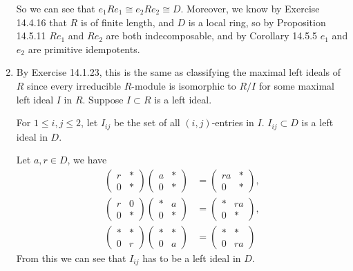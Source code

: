 \documentclass[a4paper, 12pt]{article}
\begin{document}
\begin{solution}
\begin{enumerate}[(1)]
So we can see that \(e_1Re_1\cong e_2Re_2\cong D\). Moreover, we know by Exercise 14.4.16 that \(R\) is of finite length, and \(D\) is a local ring, so by Proposition 14.5.11 \(Re_1\) 
and \(Re_2\) are both indecomposable, and by Corollary 14.5.5 \(e_1\) and \(e_2\) are primitive idempotents.
\item By Exercise 14.1.23, this is the same as classifying the maximal left ideals of \(R\) since every irreducible \(R\)-module is isomorphic to \(R/I\) for some maximal left ideal \(I\) in \(R\). Suppose \(I\subset R\) is a left ideal. 
\begin{claim}
For \(1\leq i,j\leq 2\), let \(I_{ij}\) be the set of all \((i,j)\)-entries in \(I\). \(I_{ij}\subset D\) is a left ideal in \(D\).
\end{claim}
\begin{claimproof}
Let \(a,r\in D\), we have 
\begin{align*}
\begin{pmatrix}
    r&*\\ 
    0&*
\end{pmatrix}\begin{pmatrix}
    a&*\\ 
    0&*
\end{pmatrix}&=\begin{pmatrix}
    ra&*\\ 
    0&*
\end{pmatrix},\\[5pt]
\begin{pmatrix}
    r&0\\ 
    0&*
\end{pmatrix}\begin{pmatrix}
    *&a\\ 
    0&*
\end{pmatrix}&=\begin{pmatrix}
    *&ra\\ 
    0&*
\end{pmatrix},\\[5pt]
\begin{pmatrix}
    *&*\\ 
    0&r
\end{pmatrix}\begin{pmatrix}
    *&*\\ 
    0&a
\end{pmatrix}&=\begin{pmatrix}
    *&*\\ 
    0&ra
\end{pmatrix}
\end{align*}
From this we can see that \(I_{ij}\) has to be a left ideal in \(D\).
\end{claimproof}


\end{enumerate}
\end{solution}
\end{document}
